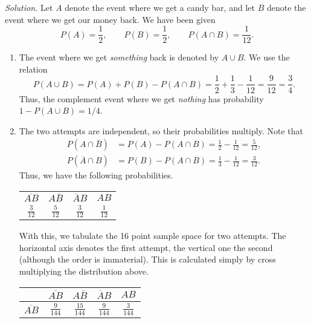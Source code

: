 \documentclass[10pt]{article}
\begin{document}
        \textit{Solution.} Let $A$ denote the event where we get a candy bar, and let $B$ denote the event where we get our money back.
        We have been given
        \[
                P(A) = \frac{1}{2}, \qquad P(B) = \frac{1}{2}, \qquad P(A \cap B) = \frac{1}{12}.
        \]
        \begin{enumerate}
                \item The event where we get \textit{something} back is denoted by $A \cup B$. We use the relation
                \[
                        P(A \cup B) = P(A) + P(B) - P(A \cap B) = \frac{1}{2} + \frac{1}{3} - \frac{1}{12} = \frac{9}{12} = \frac{3}{4}.
                \]
                Thus, the complement event where we get \textit{nothing} has probability $1 - P(A \cup B) = 1 /4$.

                \item The two attempts are independent, so their probabilities multiply.
                Note that
                \begin{align*}
                        P(A \cap \overline{B}) &= P(A) - P(A \cap B) = \frac{1}{2} - \frac{1}{12} = \frac{5}{12}, \\
                        P(\overline{A} \cap B) &= P(B) - P(A \cap B) = \frac{1}{3} - \frac{1}{12} = \frac{3}{12}.
                \end{align*}
                Thus, we have the following probabilities.
                \begin{center}
                \begin{tabular}{cccc}
                        $\overline{AB}$ & $A\overline{B}$ & $\overline{A}B$ & $AB$ \\
                        $\frac{3}{12}$  & $\frac{5}{12}$  & $\frac{3}{12}$  & $\frac{1}{12}$
                \end{tabular}
                \end{center}
                With this, we tabulate the 16 point sample space for two attempts. The horizontal axis denotes the first attempt, the vertical
                one the second (although the order is immaterial). This is calculated simply by cross multiplying the distribution above.
                \begin{center}
                \begin{tabular}{c|cccc}
                                        & $\overline{AB}$  & $A\overline{B}$  & $\overline{A}B$  & $AB$ \\\hline
                        $\overline{AB}$ & $\frac{9}{144}$  & $\frac{15}{144}$ & $\frac{9}{144}$  & $\frac{3}{144}$ \\

\end{tabular}
\end{center}
\end{enumerate}
\end{document}
